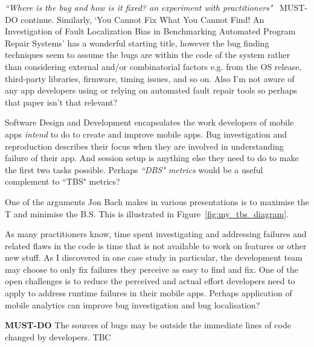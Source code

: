 \emph{``Where is the bug and how is it fixed? an experiment with practitioners"}~\citep{bohme2017_where_is_the_bug_and_how_is_it_fixed} MUST-DO continue. Similarly, `You Cannot Fix What You Cannot Find! An Investigation of Fault Localization Bias in Benchmarking Automated Program Repair Systems' has a wonderful starting title, however the bug finding techniques seem to assume the bugs are within the code of the system rather than considering external and/or combinatorial factors e.g. from the OS release, third-party libraries, firmware, timing issues, and so on. Also I'm not aware of any app developers using or relying on automated fault repair tools so perhaps that paper isn't that relevant?

Software Design and Development encapsulates the work developers of mobile apps \emph{intend} to do to create and improve mobile apps. Bug investigation and reproduction describes their focus when they are involved in understanding failure of their app. And session setup is anything else they need to do to make the first two tasks possible. Perhaps \emph{``DBS" metrics} would be a useful complement to ``TBS" metrics?

One of the arguments Jon Bach makes in various presentations is to maximise the T and minimise the B.S. This is illustrated in Figure~\ref{fig:my_tbs_diagram}.


As many practitioners know, time spent investigating and addressing failures and related flaws in the code is time that is not available to work on features or other new stuff. As I discovered in one case study in particular, the development team may choose to only fix failures they perceive as easy to find and fix. One of the open challenges is to reduce the perceived and actual effort developers need to apply to address runtime failures in their mobile apps. 
%
Perhaps application of mobile analytics can improve bug investigation and bug localisation? 

\textbf{MUST-DO} The sources of bugs may be outside the immediate lines of code changed by developers. TBC~\citep{10.1145/3239235.3267436}

